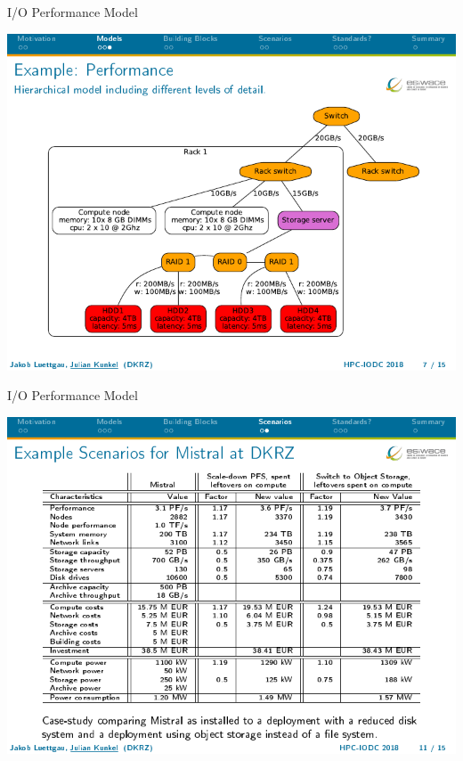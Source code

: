 \documentclass[compress,11pt,xcolor=svgnames,aspectratio=169]{beamer}
\begin{document}
\begin{frame}[fragile]{I/O Performance Model}

\nocite{CAPMFESDMA19}

\begin{center}
\includegraphics[scale=0.7]{fig/bottleneck3}
\end{center}

\end{frame}

\begin{frame}[fragile]{I/O Performance Model}

\nocite{CAPMFESDMA19}

\begin{center}
\includegraphics[scale=0.7]{fig/bottleneck4}
\end{center}

\end{frame}
\end{document}
